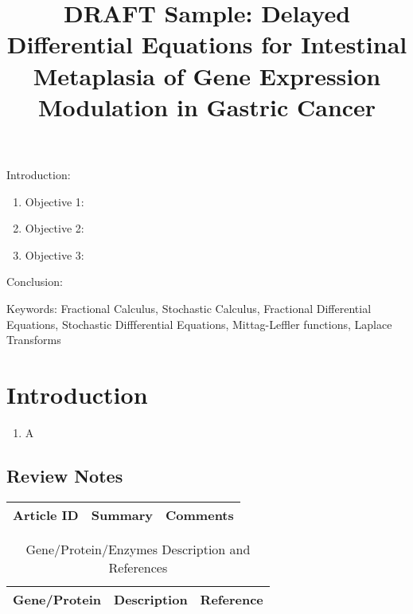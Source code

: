 


\twocolumn
\scriptsize
\begin{frontmatter}
		\title{DRAFT Sample: Delayed Differential Equations for Intestinal Metaplasia of Gene Expression Modulation in Gastric Cancer}
		\author{}
		\address{The Mathematical Learning Space}
\end{frontmatter}	

Introduction:
\begin{enumerate}
\item Objective 1:
\item Objective 2:
\item Objective 3:
\end{enumerate}
Conclusion:

Keywords: Fractional Calculus, Stochastic Calculus, Fractional Differential Equations, Stochastic Diffferential Equations, Mittag-Leffler functions, Laplace Transforms

\section{Introduction}

\begin{enumerate}
	\item A \cite{key1}
\end{enumerate}

\subsection{Review Notes}

\begin{table}[H]\centering
	\begin{tabular}{p{1cm}p{4cm}p{3cm}}
		Article ID & Summary & Comments\\
		\hline
		\hline
	\end{tabular}
\end{table}

\centering	
\begin{table}[H]\tiny
	\caption{Gene/Protein/Enzymes Description and References}	
	\begin{tabular}{r|p{4cm}|l}
		\hline	
		Gene/Protein & Description & Reference \\
		\hline 
		\hline 
	\end{tabular}
\end{table}

